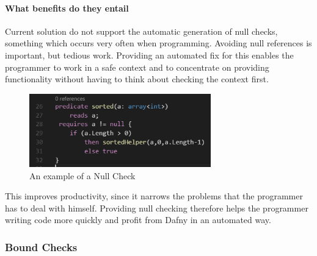\paragraph{What benefits do they entail}
Current solution do not support the automatic generation of null checks, something which occurs very often when programming. Avoiding null references is important, but tedious work. Providing an automated fix for this enables the programmer to work in a safe context and to concentrate on providing functionality without having to think about checking the context first. \newline
\begin{figure}[H]
	\centering
	\includegraphics[width=0.7\textwidth]{img/nullCheckApplied}
	\caption{An example of a Null Check}
	\label{fig:dfnullcheckapplied}
\end{figure}
This improves productivity, since it narrows the problems that the programmer has to deal with himself. Providing null checking therefore helps the programmer writing code more quickly and profit from Dafny in an automated way.
\subsubsection{Bound Checks}
